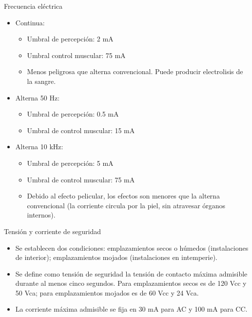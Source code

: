 \documentclass[xcolor={usenames,svgnames,dvipsnames}]{beamer}
\begin{document}
\begin{frame}[label={sec:org7685a07}]{Frecuencia eléctrica}
\begin{itemize}
\item Continua:

\begin{itemize}
\item Umbral de percepción: 2 mA

\item Umbral control muscular: 75 mA

\item Menos peligrosa que alterna convencional. Puede producir
electrolisis de la sangre.
\end{itemize}

\item Alterna 50 Hz:

\begin{itemize}
\item Umbral de percepción: 0.5 mA

\item Umbral de control muscular: 15 mA
\end{itemize}

\item Alterna 10 kHz:

\begin{itemize}
\item Umbral de percepción: 5 mA

\item Umbral de control muscular: 75 mA

\item Debido al efecto pelicular, los efectos son menores que la alterna
convencional (la corriente circula por la piel, sin atravesar
órganos internos).
\end{itemize}
\end{itemize}
\end{frame}

\begin{frame}[label={sec:orgd525e4d}]{Tensión y corriente de seguridad}
\begin{itemize}
\item Se establecen dos condiciones: \alert{emplazamientos secos o húmedos}
(instalaciones de interior); \alert{emplazamientos mojados} (instalaciones
en intemperie).

\item Se define como tensión de seguridad la tensión de contacto máxima
admisible durante al menos cinco segundos. Para emplazamientos secos
es de 120 Vcc y 50 Vca; para \alert{emplazamientos mojados es de 60 Vcc y
24 Vca}.

\item \alert{La corriente máxima admisible se fija en 30 mA para AC y 100 mA para
CC}.
\end{itemize}
\end{frame}
\end{document}
